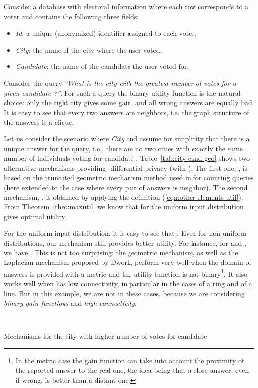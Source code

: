 \documentclass{llncs}
\begin{document}
\begin{example} Consider a database with electoral information where each row corresponds to a voter and contains the following  three fields:

\begin{itemize}
\item \emph{Id}: a unique (anonymized) identifier assigned to each voter;
\item \emph{City}: the name of the city where the user voted;
\item \emph{Candidate}: the name of the candidate the user voted for.
\end{itemize}

Consider the query \emph{``What is the city with the greatest number of votes for a given candidate ?''}. For such a query the binary  utility function is the natural choice: only the right city gives some gain, and all  wrong answers are equally bad. It is easy to see that every two answers are neighbors, i.e. the graph structure of the answers is a clique. 

Let us consider the scenario where \emph{City}  and assume for simplicity that there is a unique answer for the query, i.e., there are no two cities with exactly the same number of individuals voting for candidate . Table~\ref{tab:city-cand-geo} shows two alternative mechanisms providing -differential privacy (with ). The first one, , is based on the truncated geometric mechanism method used in \cite{Ghosh:09:STC} for counting queries (here extended to the case where every pair of answers is neighbor). The second mechanism, , is obtained by applying the definition  (\ref{eqn:other-elements-util}). From 
Theorem~\ref{theo:maxutil} we know that for the uniform input distribution  gives optimal utility.


For the uniform input distribution, it is easy to see that . Even for non-uniform distributions, our mechanism still provides better utility. For instance, for  and , we have .
This is not too surprising: the geometric mechanism, as well as the Laplacian mechanism proposed by Dwork, perform  very well when the domain of answers is provided with a metric and the utility function is not binary\footnote{In the metric case  the gain function can take into account the proximity of the reported answer to the real one, the idea being that a close answer, even if  wrong, is better than a distant one.}. It also works well when  has low connectivity, in particular in the cases of a ring and of a line. But in this example, we are not in these cases, because we are considering \emph{binary gain functions} and \emph{high connectivity}. 

\begin{table}[tb]
\centering	
		\ \ \ \ \ \ 
	\caption{Mechanisms for the city with higher number of votes for candidate }
	\label{tab:city-cand-geo}
\end{table}

\end{example}
\end{document}
